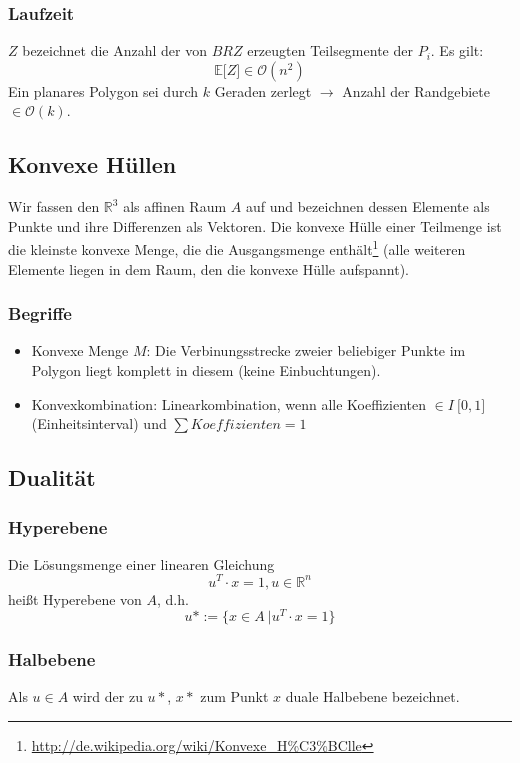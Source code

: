 \subsubsection{Laufzeit}
\(Z\) bezeichnet die Anzahl der von \(BRZ\) erzeugten Teilsegmente der \(P_i\). Es gilt:
\[\mathbb{E}\lbrack Z \rbrack \in \mathcal{O}(n^2)\]
Ein planares Polygon sei durch \(k\) Geraden zerlegt \(\rightarrow\) Anzahl der Randgebiete \(\in \mathcal{O}(k)\).


\subsection{Konvexe Hüllen}

Wir fassen den \(\mathbb{R}^3\) als affinen Raum \(A\) auf und bezeichnen dessen Elemente als Punkte und ihre Differenzen als Vektoren. Die konvexe Hülle einer Teilmenge ist die kleinste konvexe Menge, die die Ausgangsmenge enthält\footnote{\url{http://de.wikipedia.org/wiki/Konvexe_H\%C3\%BClle}} (alle weiteren Elemente liegen in dem Raum, den die konvexe Hülle aufspannt).

\subsubsection{Begriffe}
\begin{itemize}
	\item Konvexe Menge \(M\): Die Verbinungsstrecke zweier beliebiger Punkte im Polygon liegt komplett in diesem (keine Einbuchtungen).
	\item Konvexkombination: Linearkombination, wenn alle Koeffizienten \(\in I~\lbrack 0,1\rbrack\) (Einheitsinterval) und \(\sum Koeffizienten = 1\)
\end{itemize}

\subsection{Dualität}

\subsubsection{Hyperebene}
Die Lösungsmenge einer linearen Gleichung
\[u^T \cdot x = 1, u \in \mathbb{R}^n\]
heißt Hyperebene von \(A\), d.h.
\[u* := \{x \in A~|u^T \cdot x = 1\}\]

\subsubsection{Halbebene}
Als \(u \in A\) wird der zu \(u*\), \(x*\) zum Punkt \(x\) duale Halbebene bezeichnet.

